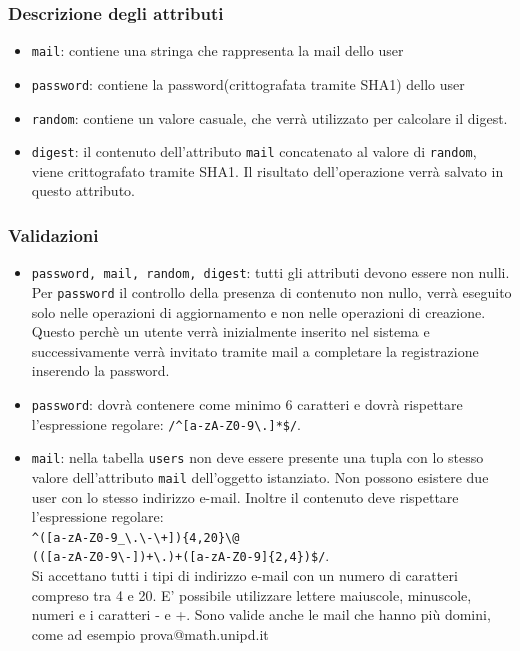 \documentclass[11pt,a4paper]{article}
\begin{document}
\subsubsection*{Descrizione degli attributi}
\begin{itemize}
 \item \verb|mail|: contiene una stringa che rappresenta la mail dello user
 \item \verb|password|: contiene la password(crittografata tramite SHA1) dello user
 \item \verb|random|: contiene un valore casuale, che verrà utilizzato per calcolare il digest.
 \item \verb|digest|: il contenuto dell'attributo \verb|mail| concatenato al valore di \verb|random|, viene crittografato tramite SHA1. Il risultato dell'operazione verrà salvato in questo attributo.
\end{itemize}
\subsubsection*{Validazioni}
\begin{itemize}
\item \verb|password, mail, random, digest|: tutti gli attributi devono essere non nulli. Per \verb|password| il controllo della presenza di contenuto non nullo, verrà eseguito solo nelle operazioni di aggiornamento e non nelle operazioni di creazione. Questo perchè un utente verrà inizialmente inserito nel sistema e successivamente verrà invitato tramite mail a completare la registrazione inserendo la password. 
\item \verb|password|: dovrà contenere come minimo 6 caratteri e dovrà rispettare l'espressione regolare: \verb|/^[a-zA-Z0-9\.]*$/|. 
 \item \verb|mail|: nella tabella \verb|users| non deve essere presente una tupla con lo stesso valore dell'attributo \verb|mail| dell'oggetto istanziato. Non possono esistere due user con lo stesso indirizzo e-mail. Inoltre il contenuto deve rispettare l'espressione regolare:\\
\verb|^([a-zA-Z0-9_\.\-\+]){4,20}\@|\\ \verb|(([a-zA-Z0-9\-])+\.)+([a-zA-Z0-9]{2,4})$/|.\\
Si accettano tutti i tipi di indirizzo e-mail con un numero di caratteri compreso tra 4 e 20. E' possibile utilizzare lettere maiuscole, minuscole, numeri e i caratteri - e +. Sono valide anche le mail che hanno più domini, come ad esempio prova@math.unipd.it 
\end{itemize}
\end{document}
